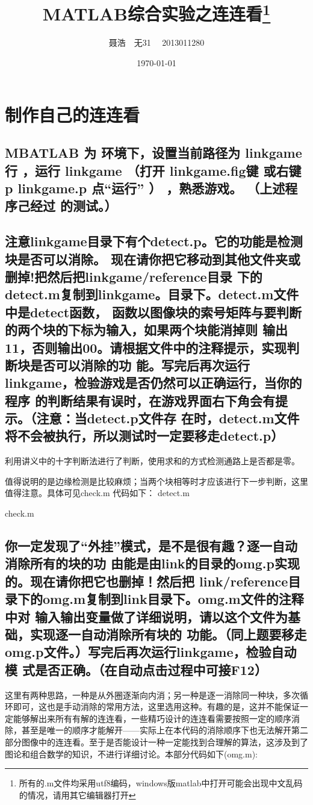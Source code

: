\documentclass{ctexart}
\title{MATLAB综合实验之连连看\footnote{所有的.m文件均采用utf8编码，windows版matlab中打开可能会出现中文乱码的情况，请用其它编辑器打开}}
\author{聂浩~~无31~~ 2013011280}
\date{\today}
\begin{document}
\maketitle
\section{制作自己的连连看}
\subsection{
MBATLAB 为 环境下，设置当前路径为  linkgame行 ，运行  linkgame （打开
linkgame.fig键 或右键 p linkgame.p  点“运行” ） ，熟悉游戏。 （上述程序己经过
的测试。）}
\subsection{
注意linkgame目录下有个detect.p。它的功能是检测块是否可以消除。
现在请你把它移动到其他文件夹或删掉!把然后把linkgame/reference目录
下的detect.m复制到linkgame。目录下。detect.m文件中是detect函数，
函数以图像块的索号矩阵与要判断的两个块的下标为输入，如果两个块能消掉则
输出11，否则输出00。请根据文件中的注释提示，实现判断块是否可以消除的功
能。写完后再次运行linkgame，检验游戏是否仍然可以正确运行，当你的程序
的判断结果有误时，在游戏界面右下角会有提示。（注意：当detect.p文件存
在时，detect.m文件将不会被执行，所以测试时一定要移走detect.p）}
利用讲义中的十字判断法进行了判断，使用求和的方式检测通路上是否都是零。

值得说明的是边缘检测是比较麻烦；当两个块相等时才应该进行下一步判断，这里值得注意。具体可见check.m
代码如下：
detect.m

check.m

\subsection{
你一定发现了“外挂”模式，是不是很有趣？逐一自动消除所有的块的功
由能是由link的目录的omg.p实现的。现在请你把它也删掉！然后把
link/reference目录下的omg.m复制到link目录下。omg.m文件的注释中对
输入输出变量做了详细说明，请以这个文件为基础，实现逐一自动消除所有块的
功能。（同上题要移走omg.p文件。）写完后再次运行linkgame，检验自动模
式是否正确。（在自动点击过程中可接F12）
}
这里有两种思路，一种是从外圈逐渐向内消；另一种是逐一消除同一种块，多次循环即可，这也是手动消除的常用方法，这里选用这种。有趣的是，这并不能保证一定能够解出来所有有解的连连看，一些精巧设计的连连看需要按照一定的顺序消除，甚至是唯一的顺序才能解开——实际上在本代码的消除顺序下也无法解开第二部分图像中的连连看。至于是否能设计一种一定能找到合理解的算法，这涉及到了图论和组合数学的知识，不进行详细讨论。本部分代码如下(omg.m):

\end{document}

